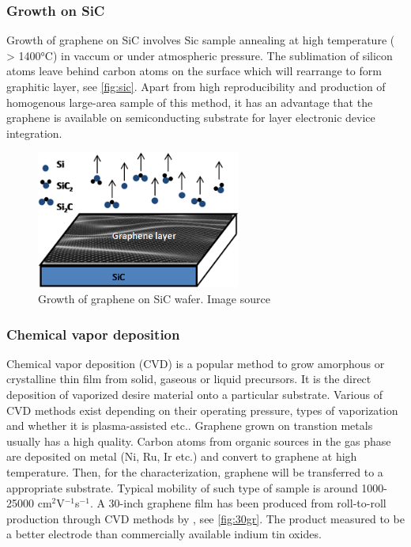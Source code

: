 \subsubsection{Growth on SiC}

Growth of graphene on SiC involves Sic sample annealing at high temperature ( > 1400\si{\celsius}) in vaccum or under atmospheric pressure. The sublimation of silicon atoms leave behind carbon atoms on the surface which will rearrange to form graphitic layer\cite{Mishra2016}, see \autoref{fig:sic}. Apart from high reproducibility and production of homogenous large-area sample of this method, it has an advantage that the graphene is available on semiconducting substrate for layer electronic device integration. 

\begin{figure}[htbp!] 
\centering  
\includegraphics[width=0.6\textwidth]{gr-sic.png}
\caption{Growth of graphene on SiC wafer. Image source \cite{mishra2016graphene}}  
\label{fig:sic}
\end{figure} 

\subsubsection{Chemical vapor deposition}

Chemical vapor deposition (CVD) is a popular method to grow amorphous or crystalline thin film from solid, gaseous or liquid precursors. It is the direct deposition of vaporized desire material onto a particular substrate. Various of CVD methods exist depending on their operating pressure, types of vaporization and whether it is plasma-assisted etc.. Graphene grown on transtion metals usually has a high quality. Carbon atoms from organic sources in the gas phase are deposited on metal (Ni, Ru, Ir etc.) and convert to graphene at high temperature. Then, for the characterization, graphene will be transferred to a appropriate substrate. Typical mobility of such type of sample is around 1000-25000 cm$^2$V$^{-1}$s$^{-1}$\cite{Petrone2012}. A 30-inch graphene film has been produced from roll-to-roll production through CVD methods by \citet{Bae2010}, see \autoref{fig:30gr}. The product measured to be a better electrode than commercially available indium tin oxides.

